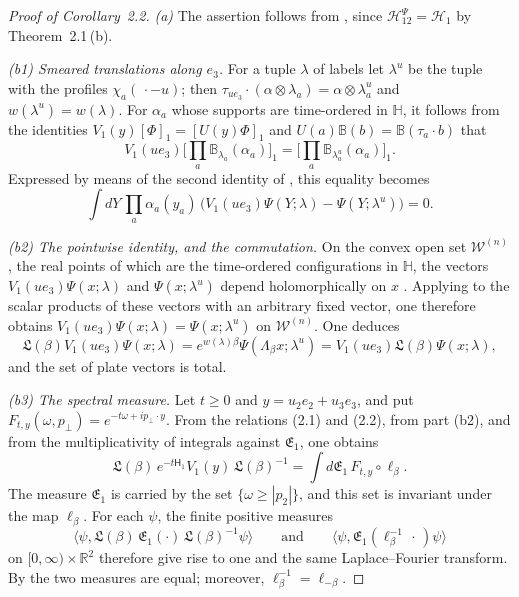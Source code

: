 \documentclass[11pt,letterpaper,reqno]{amsart}
\theoremstyle{definition}
\begin{document}
\begin{proof}[Proof of Corollary~2.2]
\emph{(a)} The assertion follows from \cite[Proposition~14.47\,(c)]{QEDII}, since $\mathcal H^{\Psi}_{12}=\mathcal H_1$ by Theorem~2.1\,(b).

\emph{(b1) Smeared translations along $e_3$.}
For a tuple $\lambda$ of labels let $\lambda^u$ be the tuple with the profiles $\chi_a(\,\cdot-u)$; then $\tau_{ue_3}\cdot(\alpha\otimes\lambda_a)=\allowbreak \alpha\otimes\lambda_a^u$ and $w(\lambda^u)=w(\lambda)$.
For $\alpha_a$ whose supports are time-ordered in $\mathbb H$, it follows from the identities $V_1(y)[\Phi]_1=[U(y)\Phi]_1$ \cite[Definition~2.38]{QEDII} and $U(a)\mathbb B(b)=\mathbb B(\tau_a\cdot b)$ \cite[Lemma~14.3\,(a)]{QEDII} that
\begin{equation*}
V_1(ue_3)\Big[\prod_a\mathbb B_{\lambda_a}(\alpha_a)\Big]_1=\Big[\prod_a\mathbb B_{\lambda_a^u}(\alpha_a)\Big]_1.
\end{equation*}
Expressed by means of the second identity of \cite[Proposition~14.22\,(b)]{QEDII}, this equality becomes
\begin{equation*}
\int dY\,\prod_a\alpha_a(y_a)\,\big(V_1(ue_3)\Psi(Y;\lambda)-\Psi(Y;\lambda^u)\big)=0.
\end{equation*}

\emph{(b2) The pointwise identity, and the commutation.}
On the convex open set $\mathcal W^{(n)}$, the real points of which are the time-ordered configurations in $\mathbb H$, the vectors $V_1(ue_3)\Psi(x;\lambda)$ and $\Psi(x;\lambda^u)$ depend holomorphically on $x$ \cite[Proposition~14.22\,(c)]{QEDII}.
Applying \cite[Lemma~14.10\,(g), (a)]{QEDII} to the scalar products of these vectors with an arbitrary fixed vector, one therefore obtains $V_1(ue_3)\Psi(x;\lambda)=\Psi(x;\lambda^u)$ on $\mathcal W^{(n)}$.
One deduces
\begin{equation*}
\mathfrak L(\beta)V_1(ue_3)\Psi(x;\lambda)=e^{w(\lambda)\beta}\Psi(\Lambda_\beta x;\lambda^u)=V_1(ue_3)\mathfrak L(\beta)\Psi(x;\lambda),
\end{equation*}
and the set of plate vectors is total.

\emph{(b3) The spectral measure.}
Let $t\ge0$ and $y=u_2e_2+u_3e_3$, and put $F_{t,y}(\omega,p_\perp)=e^{-t\omega+ip_\perp\cdot y}$.
From the relations (2.1) and (2.2), from part (b2), and from the multiplicativity of integrals against $\mathfrak E_1$, one obtains
\begin{equation*}
\mathfrak L(\beta)\,e^{-t\mathsf H_1}V_1(y)\,\mathfrak L(\beta)^{-1}=\int d\mathfrak E_1\,F_{t,y}\circ\ell_\beta.
\end{equation*}
The measure $\mathfrak E_1$ is carried by the set $\{\omega\ge|p_2|\}$, and this set is invariant under the map $\ell_\beta$.
For each $\psi$, the finite positive measures
\begin{equation*}
\langle\psi,\mathfrak L(\beta)\,\mathfrak E_1(\cdot)\,\mathfrak L(\beta)^{-1}\psi\rangle\qquad\text{and}\qquad\langle\psi,\mathfrak E_1(\ell_\beta^{-1}\,\cdot\,)\psi\rangle
\end{equation*}
on $[0,\infty)\times\mathbb R^2$ therefore give rise to one and the same Laplace--Fourier transform.
By \cite[Lemma~12.25]{QEDII} the two measures are equal; moreover, $\ell_\beta^{-1}=\ell_{-\beta}$.


\end{proof}
\end{document}
